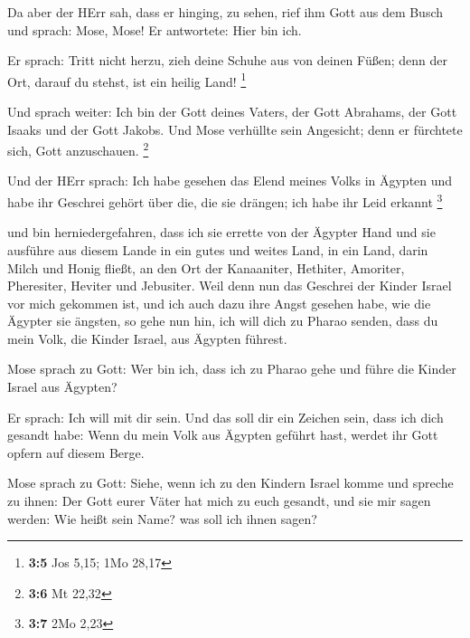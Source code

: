  Da aber der HErr sah, dass er hinging, zu sehen, rief ihm
Gott aus dem Busch und sprach: Mose, Mose! Er antwortete: Hier bin ich.

 Er sprach: Tritt nicht herzu, zieh deine Schuhe aus von
deinen Füßen; denn der Ort, darauf du stehst, ist ein heilig Land!
\footnote{\textbf{3:5} Jos 5,15; 1Mo 28,17}

 Und sprach weiter: Ich bin der Gott deines Vaters, der Gott
Abrahams, der Gott Isaaks und der Gott Jakobs. Und Mose verhüllte sein
Angesicht; denn er fürchtete sich, Gott anzuschauen. \footnote{\textbf{3:6}
  Mt 22,32}

 Und der HErr sprach: Ich habe gesehen das Elend meines
Volks in Ägypten und habe ihr Geschrei gehört über die, die sie drängen;
ich habe ihr Leid erkannt \footnote{\textbf{3:7} 2Mo 2,23}

 und bin herniedergefahren, dass ich sie errette von der
Ägypter Hand und sie ausführe aus diesem Lande in ein gutes und weites
Land, in ein Land, darin Milch und Honig fließt, an den Ort der
Kanaaniter, Hethiter, Amoriter, Pheresiter, Heviter und Jebusiter.
 Weil denn nun das Geschrei der Kinder Israel vor mich
gekommen ist, und ich auch dazu ihre Angst gesehen habe, wie die Ägypter
sie ängsten,  so gehe nun hin, ich will dich zu Pharao
senden, dass du mein Volk, die Kinder Israel, aus Ägypten führest.

 Mose sprach zu Gott: Wer bin ich, dass ich zu Pharao gehe
und führe die Kinder Israel aus Ägypten?

 Er sprach: Ich will mit dir sein. Und das soll dir ein
Zeichen sein, dass ich dich gesandt habe: Wenn du mein Volk aus Ägypten
geführt hast, werdet ihr Gott opfern auf diesem Berge.

 Mose sprach zu Gott: Siehe, wenn ich zu den Kindern Israel
komme und spreche zu ihnen: Der Gott eurer Väter hat mich zu euch
gesandt, und sie mir sagen werden: Wie heißt sein Name? was soll ich
ihnen sagen?

